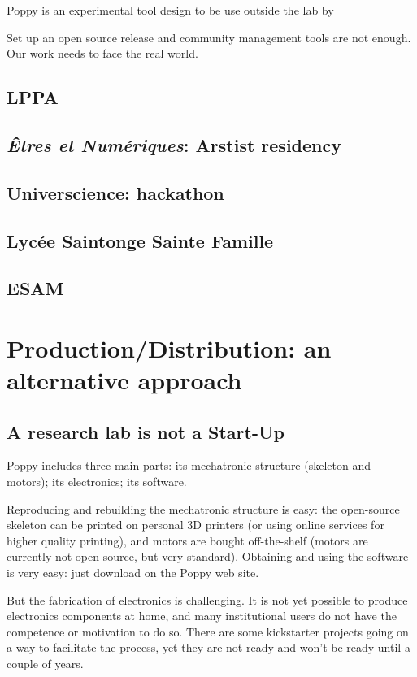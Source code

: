 Poppy is an experimental tool design to be use outside the lab by 

Set up an open source release and community management tools are not enough. Our work needs to face the real world.

\subsection{LPPA} %

\subsection{\emph{Êtres et Numériques}: Arstist residency} %

\subsection{Universcience: hackathon} %

\subsection{Lycée Saintonge Sainte Famille} %

\subsection{ESAM} %




\section{Production/Distribution: an alternative approach} %

\subsection{A research lab is not a Start-Up} %
Poppy includes three main parts: its mechatronic structure (skeleton and motors); its electronics; its software.

Reproducing and rebuilding the mechatronic structure is easy: the open-source skeleton can be printed on personal 3D printers (or using online services for higher quality printing), and motors are bought off-the-shelf (motors are currently not open-source, but very standard). Obtaining and using the software is very easy: just download on the Poppy web site.

But the fabrication of electronics is challenging. It is not yet possible to produce electronics components at home, and many institutional users do not have the competence or motivation to do so. There are some kickstarter projects going on a way to facilitate the process, yet they are not ready and won't be ready until a couple of years.

